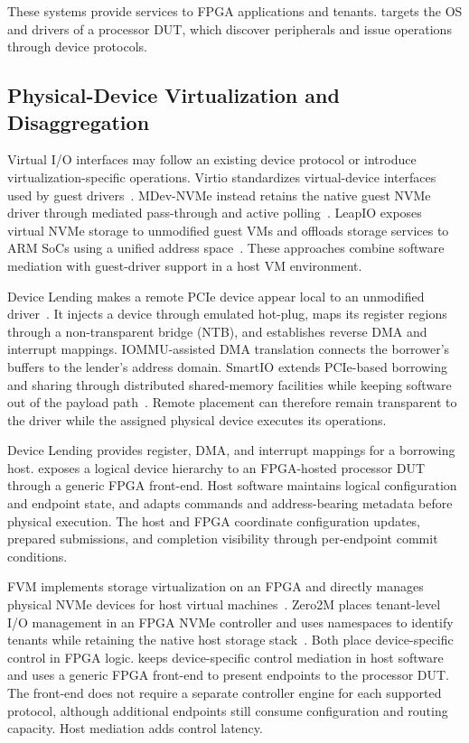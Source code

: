 These systems provide services to FPGA applications and tenants. \sys
targets the OS and drivers of a processor DUT, which discover peripherals
and issue operations through device protocols.

\subsection{Physical-Device Virtualization and Disaggregation}

Virtual I/O interfaces may follow an existing device protocol or introduce
virtualization-specific operations. Virtio standardizes virtual-device interfaces used by
guest drivers~\cite{russell2008virtio}. MDev-NVMe instead retains the native
guest NVMe driver through mediated pass-through and active
polling~\cite{peng2018mdev}. LeapIO exposes virtual NVMe storage to unmodified
guest VMs and offloads storage services to ARM SoCs using a unified address
space~\cite{li2020leapio}. These approaches combine software mediation with
guest-driver support in a host VM environment.

Device Lending makes a remote PCIe device appear local to an unmodified
driver~\cite{markussen2018lending}. It injects a device through emulated
hot-plug, maps its register regions through a non-transparent bridge (NTB),
and establishes reverse DMA and interrupt mappings. IOMMU-assisted DMA
translation connects the borrower's buffers to the lender's address domain.
SmartIO extends PCIe-based borrowing and sharing through distributed
shared-memory facilities while keeping software out of the payload
path~\cite{markussen2021smartio}. Remote placement can therefore remain
transparent to the driver while the assigned physical device executes
its operations.

Device Lending provides register, DMA, and interrupt mappings for a
borrowing host. \sys exposes a logical device hierarchy to an FPGA-hosted
processor DUT through a generic FPGA front-end. Host software maintains
logical configuration and endpoint state, and adapts commands and
address-bearing metadata before physical execution. The host and FPGA
coordinate configuration updates, prepared submissions, and completion
visibility through per-endpoint commit conditions.

FVM implements storage virtualization on an FPGA and directly manages physical
NVMe devices for host virtual machines~\cite{kwon2020fvm}. Zero2M places
tenant-level I/O management in an FPGA NVMe controller and uses namespaces to
identify tenants while retaining the native host storage
stack~\cite{wang2026zero2m}. Both place device-specific control in FPGA logic.
\sys keeps device-specific control mediation in host software and uses a
generic FPGA front-end to present endpoints to the processor DUT. The front-end
does not require a separate controller engine for each supported protocol,
although additional endpoints still consume configuration and routing
capacity. Host mediation adds control latency.

